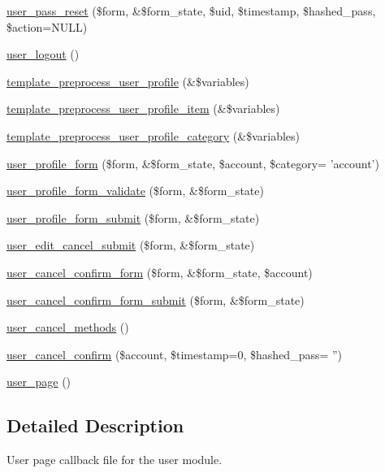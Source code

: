\begin{DoxyCompactItemize}
\item 
\hyperlink{user_8pages_8inc_a41329f7d60f984554b8630fcba94b388}{user\_\-pass\_\-reset} (\$form, \&\$form\_\-state, \$uid, \$timestamp, \$hashed\_\-pass, \$action=NULL)
\item 
\hyperlink{user_8pages_8inc_a239a2e50f18165d4a8b4c8bd3917466e}{user\_\-logout} ()
\item 
\hyperlink{user_8pages_8inc_a5a1229a0cb26128b7efab80c025e2d75}{template\_\-preprocess\_\-user\_\-profile} (\&\$variables)
\item 
\hyperlink{user_8pages_8inc_ab6e6ed16b5647c626cc0468506abd3e9}{template\_\-preprocess\_\-user\_\-profile\_\-item} (\&\$variables)
\item 
\hyperlink{user_8pages_8inc_a0b8961894318ad623017b48569515d4a}{template\_\-preprocess\_\-user\_\-profile\_\-category} (\&\$variables)
\item 
\hyperlink{group__forms_ga600bbf7cf395cbfedae1c3bc33727346}{user\_\-profile\_\-form} (\$form, \&\$form\_\-state, \$account, \$category= 'account')
\item 
\hyperlink{user_8pages_8inc_afca5f516f0fadcb918e6d13dff66db76}{user\_\-profile\_\-form\_\-validate} (\$form, \&\$form\_\-state)
\item 
\hyperlink{user_8pages_8inc_ac10455f162f61cbf551fe7ec7b5c92cc}{user\_\-profile\_\-form\_\-submit} (\$form, \&\$form\_\-state)
\item 
\hyperlink{user_8pages_8inc_a6912a7bb727cd64eb073d3cd1de643b0}{user\_\-edit\_\-cancel\_\-submit} (\$form, \&\$form\_\-state)
\item 
\hyperlink{group__forms_ga75a9df042449e7fc294c418083052114}{user\_\-cancel\_\-confirm\_\-form} (\$form, \&\$form\_\-state, \$account)
\item 
\hyperlink{user_8pages_8inc_a44992d6b5034c5e58010d46316368308}{user\_\-cancel\_\-confirm\_\-form\_\-submit} (\$form, \&\$form\_\-state)
\item 
\hyperlink{user_8pages_8inc_a11f0201b4e77086622c55fd3ed13bb93}{user\_\-cancel\_\-methods} ()
\item 
\hyperlink{user_8pages_8inc_ac3ab92d15edab48212f460e0eabaafb6}{user\_\-cancel\_\-confirm} (\$account, \$timestamp=0, \$hashed\_\-pass= '')
\item 
\hyperlink{user_8pages_8inc_aac56f8d931a31fe423974228cec2cf57}{user\_\-page} ()
\end{DoxyCompactItemize}


\subsection{Detailed Description}
User page callback file for the user module. 

